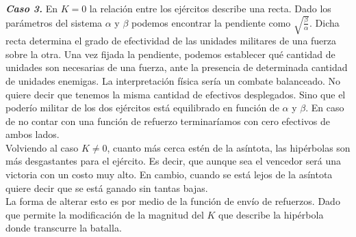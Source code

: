 \documentclass{sig-alternate}
\begin{document}
\textbf{\textit{Caso 3.}} 
En $K=0$ la relación entre los ejércitos describe una recta. Dado los parámetros del sistema $\alpha$ y $\beta$ podemos encontrar la pendiente como $\sqrt{\frac{\beta}{\alpha}}$. Dicha recta determina el grado de efectividad de las unidades militares de una fuerza sobre la otra. Una vez fijada la pendiente, podemos 
establecer qué cantidad de unidades son necesarias de una fuerza, ante la presencia de determinada cantidad de unidades enemigas. 
La interpretación f\'isica ser\'ia un combate balanceado. No quiere decir que tenemos la misma cantidad de efectivos desplegados. Sino que el poderío militar de los dos ej\'ercitos está equilibrado en función de $\alpha$ y $\beta$. En caso de no contar con una funci\'on de refuerzo terminar\'iamos con cero efectivos de ambos lados. \\
Volviendo al caso $K \ne 0$, cuanto m\'as cerca est\'en de la as\'intota, las hip\'erbolas son m\'as desgastantes para el ej\'ercito. Es decir, que aunque sea el vencedor será una victoria con un costo  muy alto. En cambio, cuando se está lejos de la as\'intota
quiere decir que se está ganado sin tantas bajas. \\
La forma de alterar esto es por medio de la función de envío de refuerzos. Dado que permite la modificación de la magnitud del $K$ que describe la hipérbola donde transcurre la batalla. 
\end{document}
